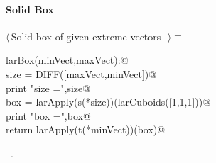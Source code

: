 \documentclass[11pt,oneside]{article}	%
\begin{document}
\paragraph{Solid Box}
\begin{flushleft} \small \label{scrap15}
$\langle\,$Solid box of given extreme vectors\nobreak\ {\footnotesize {}}$\,\rangle\equiv$
\vspace{-1ex}
\begin{list}{}{} \item
\mbox{}\verb@def larBox(minVect,maxVect):@\\
\mbox{}\verb@   size = DIFF([maxVect,minVect])@\\
\mbox{}\verb@   print "size =",size@\\
\mbox{}\verb@   box = larApply(s(*size))(larCuboids([1,1,1]))@\\
\mbox{}\verb@   print "box =",box@\\
\mbox{}\verb@   return larApply(t(*minVect))(box)@\\
\mbox{}\verb@@{\NWsep}
\end{list}
\vspace{-1ex}
\footnotesize\addtolength{\baselineskip}{-1ex}
\begin{list}{}{\setlength{\itemsep}{-\parsep}\setlength{\itemindent}{-\leftmargin}}
\item \NWtxtMacroRefIn\ .
\end{list}
\end{flushleft}
\end{document}
